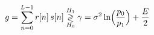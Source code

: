 \documentclass[preview]{standalone}
\begin{document}
\begin{align*}
\special{dvisvgm:raw <g id='unique000'>}g=\sum_{n=0}^{L-1}r[n]\,s[n]\underset{H_0}{\overset{H_1}{\gtrless}}\gamma=\sigma^2\ln\!\Big(\frac{p_0}{p_1}\Big)+\frac{E}{2}\special{dvisvgm:raw </g>}
\end{align*}
\end{document}
